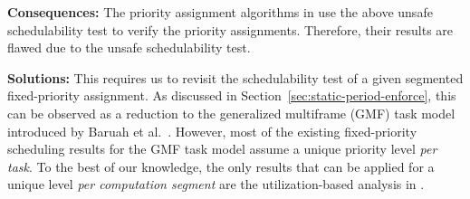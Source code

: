 {\bf Consequences:} The priority assignment algorithms in \cite{RTSS-KimANR13,DBLP:journals/ieicet/DingTT09} use the above unsafe schedulability test to verify the priority assignments. Therefore, their results are flawed due to the unsafe schedulability test.

{\bf Solutions:} This requires us to revisit the schedulability test of a given segmented fixed-priority assignment. As discussed in Section~\ref{sec:static-period-enforce}, this can be observed as a reduction to 
the generalized multiframe (GMF) task model introduced by Baruah et al.~\cite{baruah1999generalized}. However, most of the existing fixed-priority scheduling results for the GMF task model assume a unique priority level \emph{per task}. To the best of our knowledge, the only results that can be applied for a unique level \emph{per computation segment} are the utilization-based analysis in \cite{DBLP:journals/corr/ChenHL15b,huang2015mode}. 









